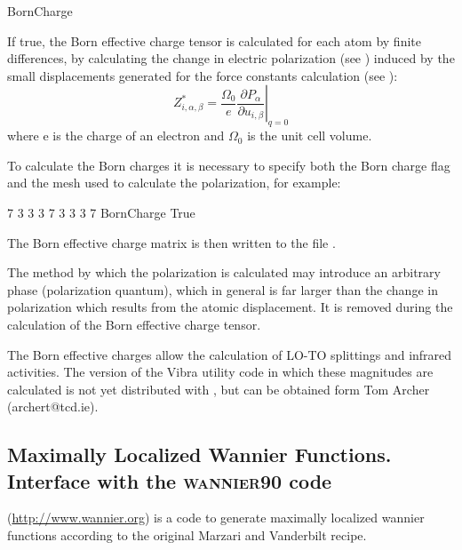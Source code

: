 \begin{fdflogicalF}{BornCharge}

  If true, the Born effective charge tensor is calculated for each
  atom by finite differences, by calculating the change in electric
  polarization (see ) induced by the small
  displacements generated for the force constants calculation (see
  ):
  \begin{equation}
    \label{eq:effective_charge}
    Z^*_{i,\alpha,\beta}=\frac{\Omega_0}{e} \left. {\frac{\partial{P_\alpha}}
          {\partial{u_{i,\beta}}}}\right|_{q=0}
  \end{equation}
  where e is the charge of an electron and $\Omega_0$ is the unit cell
  volume.

  To calculate the Born charges it is necessary to specify both the
  Born charge flag and the mesh used to calculate the polarization,
  for example:
  \begin{fdfexample}
      7  3  3
      3  7  3
      3  3  7
    BornCharge True
  \end{fdfexample}

  The Born effective charge matrix is then written to the file
  .

  The method by which the polarization is calculated may introduce an
  arbitrary phase (polarization quantum), which in general is far
  larger than the change in polarization which results from the atomic
  displacement. It is removed during the calculation of the Born
  effective charge tensor.

  The Born effective charges allow the calculation of LO-TO splittings
  and infrared activities. The version of the Vibra utility code in
  which these magnitudes are calculated is not yet distributed with
  \siesta, but can be obtained form Tom Archer (archert@tcd.ie).

\end{fdflogicalF}



\subsection[Maximally Localized Wannier Functions]%
{Maximally Localized Wannier Functions. \\
    Interface with the \textsc{wannier90} code}

 (\url{http://www.wannier.org}) is a code to generate
maximally localized wannier functions according to the original
Marzari and Vanderbilt recipe.

